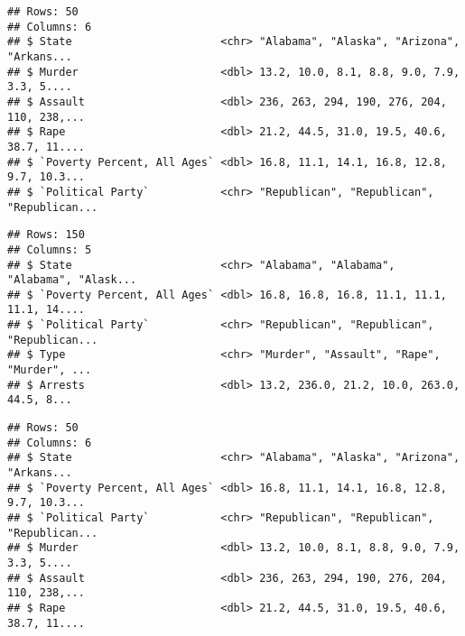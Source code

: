 \documentclass[]{article}
\newenvironment{Shaded}{\begin{snugshade}}{\end{snugshade}}
\newcommand{\CommentTok}[1]{\textcolor[rgb]{0.56,0.35,0.01}{\textit{#1}}}
\newcommand{\DataTypeTok}[1]{\textcolor[rgb]{0.13,0.29,0.53}{#1}}
\newcommand{\KeywordTok}[1]{\textcolor[rgb]{0.13,0.29,0.53}{\textbf{#1}}}
\newcommand{\NormalTok}[1]{#1}
\newcommand{\OperatorTok}[1]{\textcolor[rgb]{0.81,0.36,0.00}{\textbf{#1}}}
\newcommand{\StringTok}[1]{\textcolor[rgb]{0.31,0.60,0.02}{#1}}
\begin{document}
\begin{verbatim}
## Rows: 50
## Columns: 6
## $ State                       <chr> "Alabama", "Alaska", "Arizona", "Arkans...
## $ Murder                      <dbl> 13.2, 10.0, 8.1, 8.8, 9.0, 7.9, 3.3, 5....
## $ Assault                     <dbl> 236, 263, 294, 190, 276, 204, 110, 238,...
## $ Rape                        <dbl> 21.2, 44.5, 31.0, 19.5, 40.6, 38.7, 11....
## $ `Poverty Percent, All Ages` <dbl> 16.8, 11.1, 14.1, 16.8, 12.8, 9.7, 10.3...
## $ `Political Party`           <chr> "Republican", "Republican", "Republican...
\end{verbatim}

\begin{Shaded}
\end{Shaded}

\begin{verbatim}
## Rows: 150
## Columns: 5
## $ State                       <chr> "Alabama", "Alabama", "Alabama", "Alask...
## $ `Poverty Percent, All Ages` <dbl> 16.8, 16.8, 16.8, 11.1, 11.1, 11.1, 14....
## $ `Political Party`           <chr> "Republican", "Republican", "Republican...
## $ Type                        <chr> "Murder", "Assault", "Rape", "Murder", ...
## $ Arrests                     <dbl> 13.2, 236.0, 21.2, 10.0, 263.0, 44.5, 8...
\end{verbatim}

\begin{Shaded}
\end{Shaded}

\begin{verbatim}
## Rows: 50
## Columns: 6
## $ State                       <chr> "Alabama", "Alaska", "Arizona", "Arkans...
## $ `Poverty Percent, All Ages` <dbl> 16.8, 11.1, 14.1, 16.8, 12.8, 9.7, 10.3...
## $ `Political Party`           <chr> "Republican", "Republican", "Republican...
## $ Murder                      <dbl> 13.2, 10.0, 8.1, 8.8, 9.0, 7.9, 3.3, 5....
## $ Assault                     <dbl> 236, 263, 294, 190, 276, 204, 110, 238,...
## $ Rape                        <dbl> 21.2, 44.5, 31.0, 19.5, 40.6, 38.7, 11....
\end{verbatim}
\end{document}
